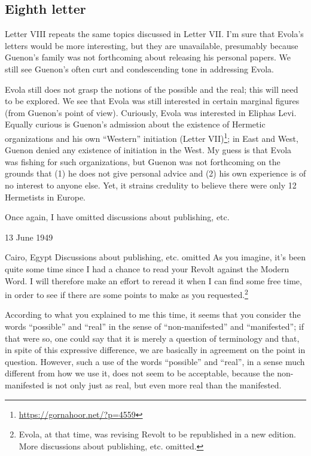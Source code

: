 \subsection{Eighth letter}

\begin{quotationx}
Letter VIII repeats the same topics discussed in Letter VII. I'm sure that Evola's letters would be more interesting, but they are unavailable, presumably because Guenon's family was not forthcoming about releasing his personal papers. We still see Guenon's often curt and condescending tone in addressing Evola.

Evola still does not grasp the notions of the possible and the real; this will need to be explored. We see that Evola was still interested in certain marginal figures (from Guenon's point of view). Curiously, Evola was interested in Eliphas Levi. Equally curious is Guenon's admission about the existence of Hermetic organizations and his own ``Western'' initiation (Letter VII)\footnote{\url{https://gornahoor.net/?p=4559}}; in East and West, Guenon denied any existence of initiation in the West. My guess is that Evola was fishing for such organizations, but Guenon was not forthcoming on the grounds that (1) he does not give personal advice and (2) his own experience is of no interest to anyone else. Yet, it strains credulity to believe there were only 12 Hermetists in Europe.

Once again, I have omitted discussions about publishing, etc.
\end{quotationx}


13 June 1949

Cairo, Egypt Discussions about publishing, etc. omitted As you imagine, it's been quite some time since I had a chance to read your Revolt against the Modern Word. I will therefore make an effort to reread it when I can find some free time, in order to see if there are some points to make as you requested.\footnote{Evola, at that time, was revising Revolt to be republished in a new edition. More discussions about publishing, etc. omitted.} 

According to what you explained to me this time, it seems that you consider the words ``possible'' and ``real'' in the sense of ``non-manifested'' and ``manifested''; if that were so, one could say that it is merely a question of terminology and that, in spite of this expressive difference, we are basically in agreement on the point in question. However, such a use of the words ``possible'' and ``real'', in a sense much different from how we use it, does not seem to be acceptable, because the non-manifested is not only just as real, but even more real than the manifested.


